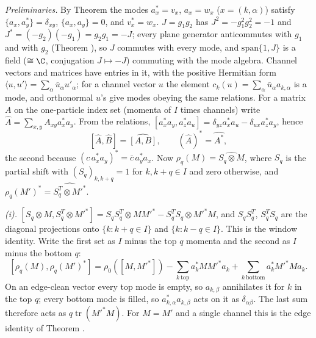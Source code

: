 \emph{Preliminaries.} By Theorem  the modes $a_{x}^{*} = v_{x}$, $a_{x} = w_{x}$ ($x = (k, \alpha)$) satisfy $\{a_{x}, a_{y}^{*}\} = \delta_{xy}$, $\{a_{x}, a_{y}\} = 0$, and $v_{x}^{*} = w_{x}$. $J = g_{1}g_{2}$ has $J^{2} = -g_{1}^{2}g_{2}^{2} = -1$ and $J^{*} = (-g_{2})(-g_{1}) = g_{2}g_{1} = -J$; every plane generator anticommutes with $g_{1}$ and with $g_{2}$ (Theorem ), so $J$ commutes with every mode, and $\mathrm{span}\{1, J\}$ is a field ($\cong \C$, conjugation $J \mapsto -J$) commuting with the mode algebra. Channel vectors and matrices have entries in it, with the positive Hermitian form $\langle u, u'\rangle = \sum_{\alpha}\bar u_{\alpha}u'_{\alpha}$; for a channel vector $u$ the element $c_{k}(u) = \sum_{\alpha}\bar u_{\alpha}a_{k,\alpha}$ is a mode, and orthonormal $u$'s give modes obeying the same relations. For a matrix $A$ on the one-particle index set (momenta of $I$ times channels) write $\hat A = \sum_{x,y}A_{xy}a_{x}^{*}a_{y}$. From the relations, $[a_{x}^{*}a_{y}, a_{z}^{*}a_{u}] = \delta_{yz}a_{x}^{*}a_{u} - \delta_{ux}a_{z}^{*}a_{y}$, hence
\[
[\hat A, \hat B] = \widehat{[A, B]}, \qquad (\hat A)^{*} = \widehat{A^{*}} ,
\]
the second because $(c\,a_{x}^{*}a_{y})^{*} = \bar c\,a_{y}^{*}a_{x}$. Now $\rho_{q}(M) = \widehat{S_{q}\otimes M}$, where $S_{q}$ is the partial shift with $(S_{q})_{k,k+q} = 1$ for $k, k + q \in I$ and zero otherwise, and $\rho_{q}(M')^{*} = \widehat{S_{q}^{T}\otimes M'^{*}}$.

\emph{(i).} $[S_{q}\otimes M, S_{q}^{T}\otimes M'^{*}] = S_{q}S_{q}^{T}\otimes MM'^{*} - S_{q}^{T}S_{q}\otimes M'^{*}M$, and $S_{q}S_{q}^{T}$, $S_{q}^{T}S_{q}$ are the diagonal projections onto $\{k : k + q \in I\}$ and $\{k : k - q \in I\}$. This is the window identity. Write the first set as $I$ minus the top $q$ momenta and the second as $I$ minus the bottom $q$:
\[
[\rho_{q}(M), \rho_{q}(M')^{*}] = \rho_{0}([M, M'^{*}]) - \sum_{k\ \mathrm{top}}a_{k}^{*}MM'^{*}a_{k} + \sum_{k\ \mathrm{bottom}}a_{k}^{*}M'^{*}Ma_{k} .
\]
On an edge-clean vector every top mode is empty, so $a_{k,\beta}$ annihilates it for $k$ in the top $q$; every bottom mode is filled, so $a_{k,\alpha}^{*}a_{k,\beta}$ acts on it as $\delta_{\alpha\beta}$. The last sum therefore acts as $q\operatorname{tr}(M'^{*}M)$. For $M = M'$ and a single channel this is the edge identity of Theorem .

